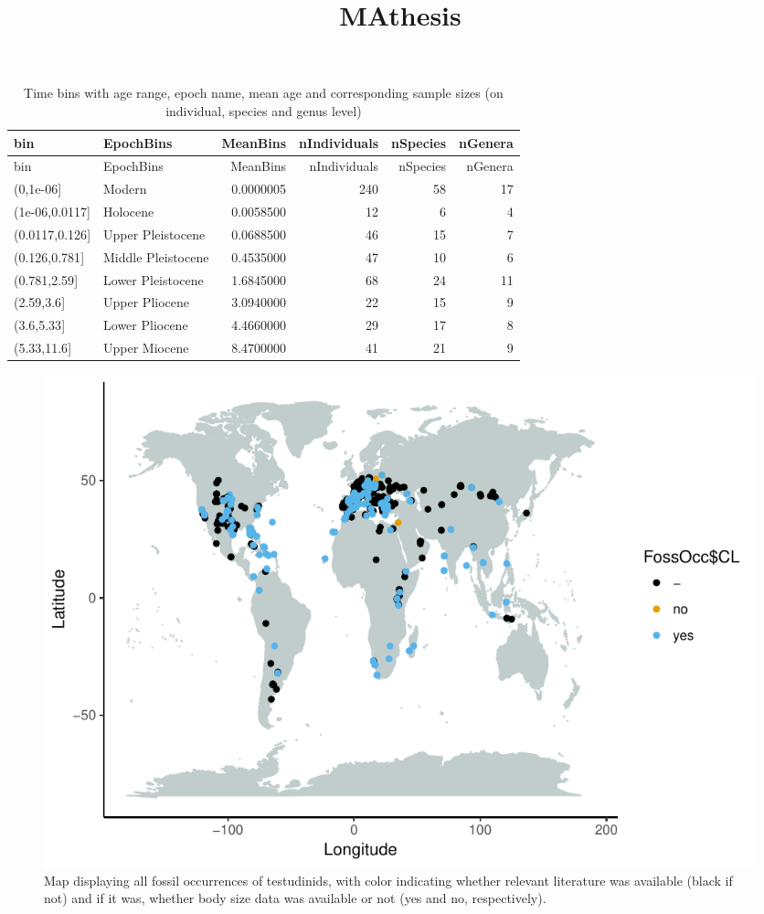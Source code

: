 \documentclass[]{article}
\title{MAthesis}
\author{}
\date{}
\begin{document}
\maketitle

\begin{longtable}[]{@{}llrrrr@{}}
\caption{Time bins with age range, epoch name, mean age and
corresponding sample sizes (on individual, species and genus
level)}\tabularnewline
\toprule
bin & EpochBins & MeanBins & nIndividuals & nSpecies &
nGenera\tabularnewline
\midrule
\endfirsthead
\toprule
bin & EpochBins & MeanBins & nIndividuals & nSpecies &
nGenera\tabularnewline
\midrule
\endhead
(0,1e-06{]} & Modern & 0.0000005 & 240 & 58 & 17\tabularnewline
(1e-06,0.0117{]} & Holocene & 0.0058500 & 12 & 6 & 4\tabularnewline
(0.0117,0.126{]} & Upper Pleistocene & 0.0688500 & 46 & 15 &
7\tabularnewline
(0.126,0.781{]} & Middle Pleistocene & 0.4535000 & 47 & 10 &
6\tabularnewline
(0.781,2.59{]} & Lower Pleistocene & 1.6845000 & 68 & 24 &
11\tabularnewline
(2.59,3.6{]} & Upper Pliocene & 3.0940000 & 22 & 15 & 9\tabularnewline
(3.6,5.33{]} & Lower Pliocene & 4.4660000 & 29 & 17 & 8\tabularnewline
(5.33,11.6{]} & Upper Miocene & 8.4700000 & 41 & 21 & 9\tabularnewline
\bottomrule
\end{longtable}

\begin{figure}[htbp]
\centering
\includegraphics{MA_JJ_files/figure-latex/Map fossil occurrences-1.pdf}
\caption{Map displaying all fossil occurrences of testudinids, with
color indicating whether relevant literature was available (black if
not) and if it was, whether body size data was available or not (yes and
no, respectively).}
\end{figure}
\end{document}
